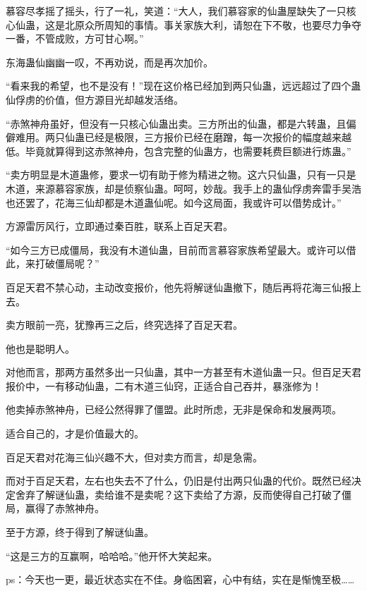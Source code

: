 \begin{this_body}
慕容尽孝摇了摇头，行了一礼，笑道：“大人，我们慕容家的仙蛊屋缺失了一只核心仙蛊，这是北原众所周知的事情。事关家族大利，请恕在下不敬，也要尽力争夺一番，不管成败，方可甘心啊。”

东海蛊仙幽幽一叹，不再劝说，而是再次加价。

“看来我的希望，也不是没有！”现在这价格已经加到两只仙蛊，远远超过了四个蛊仙俘虏的价值，但方源目光却越发活络。

“赤煞神舟虽好，但没有一只核心仙蛊出卖。三方所出的仙蛊，都是六转蛊，且偏僻难用。两只仙蛊已经是极限，三方报价已经在磨蹭，每一次报价的幅度越来越低。毕竟就算得到这赤煞神舟，包含完整的仙蛊方，也需要耗费巨额进行炼蛊。”

“卖方明显是木道蛊修，要求一切有助于修为精进之物。这六只仙蛊，只有一只是木道，来源慕容家族，却是侦察仙蛊。呵呵，妙哉。我手上的蛊仙俘虏奔雷手吴浩也还罢了，花海三仙却都是木道蛊仙呢。如今这局面，我或许可以借势成计。”

方源雷厉风行，立即通过秦百胜，联系上百足天君。

“如今三方已成僵局，我没有木道仙蛊，目前而言慕容家族希望最大。或许可以借此，来打破僵局呢？”

百足天君不禁心动，主动改变报价，他先将解谜仙蛊撤下，随后再将花海三仙报上去。

卖方眼前一亮，犹豫再三之后，终究选择了百足天君。

他也是聪明人。

对他而言，那两方虽然多出一只仙蛊，其中一方甚至有木道仙蛊一只。但百足天君报价中，一有移动仙蛊，二有木道三仙窍，正适合自己吞并，暴涨修为！

他卖掉赤煞神舟，已经公然得罪了僵盟。此时所虑，无非是保命和发展两项。

适合自己的，才是价值最大的。

百足天君对花海三仙兴趣不大，但对卖方而言，却是急需。

而对于百足天君，左右也失去不了什么，仍旧是付出两只仙蛊的代价。既然已经决定舍弃了解谜仙蛊，卖给谁不是卖呢？这下卖给了方源，反而使得自己打破了僵局，赢得了赤煞神舟。

至于方源，终于得到了解谜仙蛊。

“这是三方的互赢啊，哈哈哈。”他开怀大笑起来。

ps：今天也一更，最近状态实在不佳。身临困窘，心中有结，实在是惭愧至极……

\end{this_body}

